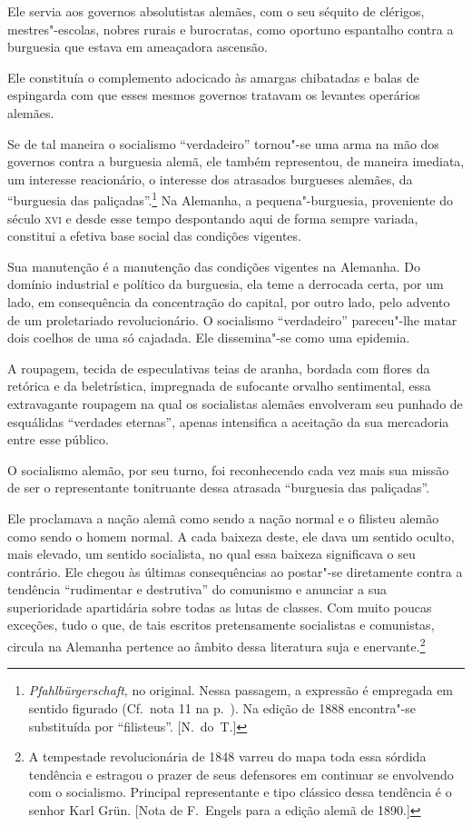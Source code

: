 Ele servia aos governos absolutistas alemães, com o seu séquito de
clérigos, mestres"-escolas, nobres rurais e burocratas, como oportuno
espantalho contra a burguesia que estava em ameaçadora ascensão.

Ele constituía o complemento adocicado às amargas chibatadas e balas de
espingarda com que esses mesmos governos tratavam os levantes operários
alemães.

Se de tal maneira o socialismo “verdadeiro” tornou"-se uma arma
na mão dos governos contra a burguesia alemã, ele também representou,
de maneira imediata, um interesse reacionário, o interesse dos
atrasados burgueses alemães, da “burguesia das paliçadas”.\footnote{ \textit
{Pfahlbürgerschaft}, no original. Nessa passagem, a expressão é empregada
em sentido figurado (Cf.~nota 11 na p.~\pageref{8}). Na edição de 1888 encontra"-se substituída 
por “filisteus”. [N.~do~T.]} Na Alemanha, a pequena"-burguesia, 
proveniente do século \textsc{xvi} e desde esse tempo despontando aqui de forma sempre 
variada, constitui a efetiva base social das condições vigentes.

Sua manutenção é a manutenção das condições vigentes na Alemanha. Do
domínio industrial e político da burguesia, ela teme a derrocada certa,
por um lado, em consequência da concentração do capital, por outro lado,
pelo advento de um proletariado revolucionário. O socialismo
“verdadeiro” pareceu"-lhe matar dois coelhos de uma só cajadada. Ele
dissemina"-se como uma epidemia.

A roupagem, tecida de especulativas teias de aranha, bordada com flores
da retórica e da beletrística, impregnada de sufocante orvalho
sentimental, essa extravagante roupagem na qual os socialistas alemães
envolveram seu punhado de esquálidas “verdades eternas”, apenas
intensifica a aceitação da sua mercadoria entre esse público.

O socialismo alemão, por seu turno, foi reconhecendo cada vez mais sua
missão de ser o representante tonitruante dessa atrasada “burguesia das
paliçadas”.

Ele proclamava a nação alemã como sendo a nação normal e o
filisteu alemão como sendo o homem normal. A cada baixeza deste, ele
dava um sentido oculto, mais elevado, um sentido socialista, no qual
essa baixeza significava o seu contrário. Ele chegou às últimas
consequências ao postar"-se diretamente contra a tendência “rudimentar
e destrutiva” do comunismo e anunciar a sua superioridade apartidária
sobre todas as lutas de classes. Com muito poucas exceções, tudo o que,
de tais escritos pretensamente socialistas e comunistas, circula na
Alemanha pertence ao âmbito dessa literatura suja e enervante.\footnote{ A 
tempestade revolucionária de 1848 varreu do mapa toda essa sórdida 
tendência e estragou o prazer de seus defensores em continuar se envolvendo
com o socialismo. Principal representante e tipo clássico dessa tendência é
o senhor Karl Grün. [Nota de F.~Engels para a edição alemã de 1890.]}

